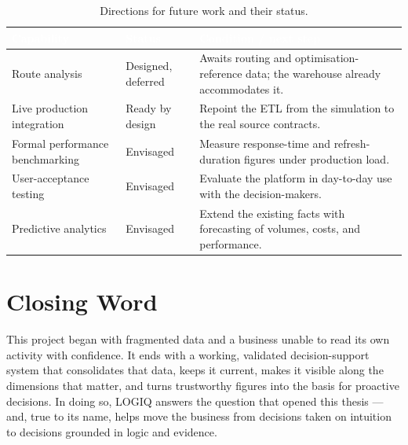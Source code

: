 \begin{table}[H]
\centering
\caption{Directions for future work and their status.}
\label{tab:concl-future}
\renewcommand{\arraystretch}{1.35}
\begin{tabularx}{\linewidth}{|>{\raggedright\arraybackslash}p{4.6cm}|>{\raggedright\arraybackslash}p{2.6cm}|>{\raggedright\arraybackslash}X|}
\hline
\rowcolor{tblheader}
\textcolor{white}{\textbf{Capability}} & \textcolor{white}{\textbf{Status}} &
\textcolor{white}{\textbf{Condition / next step}} \\
\hline
Route analysis & Designed, deferred & Awaits routing and optimisation-reference data; the warehouse
already accommodates it. \\
Live production integration & Ready by design & Repoint the ETL from the simulation to the real source
contracts. \\
Formal performance benchmarking & Envisaged & Measure response-time and refresh-duration figures under
production load. \\
User-acceptance testing & Envisaged & Evaluate the platform in day-to-day use with the decision-makers. \\
Predictive analytics & Envisaged & Extend the existing facts with forecasting of volumes, costs, and
performance. \\
\hline
\end{tabularx}
\end{table}

\section*{Closing Word}

This project began with fragmented data and a business unable to read its own activity with confidence.
It ends with a working, validated decision-support system that consolidates that data, keeps it current,
makes it visible along the dimensions that matter, and turns trustworthy figures into the basis for
proactive decisions. In doing so, LOGIQ answers the question that opened this thesis --- and, true to its
name, helps move the business from decisions taken on intuition to decisions grounded in logic and
evidence.
